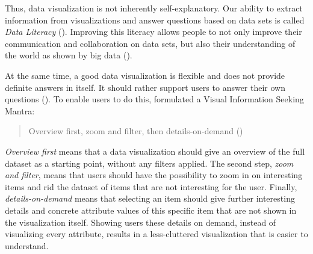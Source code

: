 Thus, data visualization is not inherently self-explanatory. Our ability to extract information from visualizations and answer questions based on data sets is called \emph{Data Literacy} (\cite{boyPrincipledWayAssessing2014}). Improving this literacy allows people to not only improve their communication and collaboration on data sets, but also their understanding of the world as shown by big data (\cite{bornerDataVisualizationLiteracy2019}).

At the same time, a good data visualization is flexible and does not provide definite answers in itself. It should rather support users to answer their own questions (\cite{light2001portable}). To enable users to do this, \citeauthor{shneidermanEyesHaveIt1996} formulated a Visual Information Seeking Mantra:

\begin{quote}
    Overview first, zoom and filter, then details-on-demand (\cite[337]{shneidermanEyesHaveIt1996})
\end{quote}

\emph{Overview first} means that a data visualization should give an overview of the full dataset as a starting point, without any filters applied. The second step, \emph{zoom and filter}, means that users should have the possibility to zoom in on interesting items and rid the dataset of items that are not interesting for the user. Finally, \emph{details-on-demand} means that selecting an item should give further interesting details and concrete attribute values of this specific item that are not shown in the visualization itself. Showing users these details on demand, instead of visualizing every attribute, results in a less-cluttered visualization that is easier to understand.

